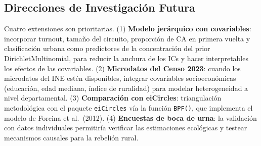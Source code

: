 \subsection{Direcciones de Investigación Futura}

Cuatro extensiones son prioritarias. (1) \textbf{Modelo jerárquico con covariables}: incorporar turnout, tamaño del circuito, proporción de CA en primera vuelta y clasificación urbana como predictores de la concentración del prior DirichletMultinomial, para reducir la anchura de los ICs y hacer interpretables los efectos de las covariables. (2) \textbf{Microdatos del Censo 2023}: cuando los microdatos del INE estén disponibles, integrar covariables socioeconómicas (educación, edad mediana, índice de ruralidad) para modelar heterogeneidad a nivel departamental. (3) \textbf{Comparación con eiCircles}: triangulación metodológica con el paquete \texttt{eiCircles} \citep{brown1986aggregate} vía la función \texttt{BPF()}, que implementa el modelo de Forcina et al.\ (2012). (4) \textbf{Encuestas de boca de urna}: la validación con datos individuales permitiría verificar las estimaciones ecológicas y testear mecanismos causales para la rebelión rural.
